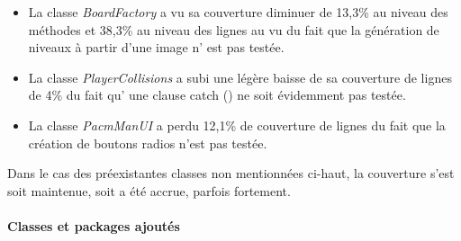 \documentclass[12pt, openany]{report}
\begin{document}
\begin{itemize}
	\item La classe \mbox{\textit{BoardFactory}} a vu sa couverture diminuer de 13,3\% au niveau des méthodes et 38,3\% au niveau des lignes au vu du fait que la génération de niveaux à partir d'une image n' est pas testée. %
	\item La classe \mbox{\textit{PlayerCollisions}} a subi une légère baisse de sa couverture de lignes de 4\% du fait qu' une clause \og catch \fg() ne soit évidemment pas testée.
	\item La classe \mbox{\textit{PacmManUI}} a perdu 12,1\% de couverture de lignes du fait que la création de boutons radios n'est pas testée.
\end{itemize}

Dans le cas des préexistantes classes non mentionnées ci-haut, la couverture s'est soit maintenue, soit a été accrue, parfois fortement.

\paragraph{Classes et packages ajoutés}
\end{document}
